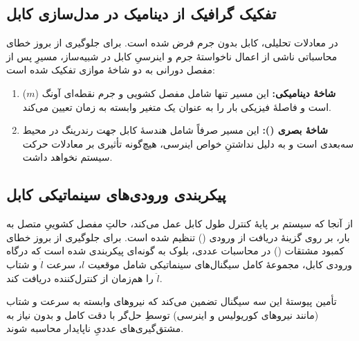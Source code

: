 \subsection{تفکیک گرافیک از دینامیک در مدل‌سازی کابل}

در معادلات تحلیلی، کابل بدون جرم فرض شده است. برای جلوگیری از بروز خطای محاسباتی ناشی از اعمال ناخواستهٔ جرم و اینرسیِ کابل در شبیه‌ساز، مسیرِ پس از مفصل دورانی به دو شاخهٔ موازی تفکیک شده است:
\begin{enumerate}
    \item \textbf{شاخهٔ دینامیکی:} این مسیر تنها شامل مفصل کشویی و جرم نقطه‌ای آونگ ($m$) است و فاصلهٔ فیزیکی بار را به عنوان یک متغیر وابسته به زمان تعیین می‌کند.
    \item \textbf{شاخهٔ بصری ():} این مسیر صرفاً شامل هندسهٔ کابل جهت رندرینگ در محیط سه‌بعدی است و به دلیل نداشتنِ خواص اینرسی، هیچ‌گونه تأثیری بر معادلات حرکت سیستم نخواهد داشت.
\end{enumerate}

\subsection{پیکربندی ورودی‌های سینماتیکی کابل}

از آنجا که سیستم بر پایهٔ کنترل طول کابل عمل می‌کند، حالتِ مفصل کشوییِ متصل به بار، بر روی گزینهٔ دریافت از ورودی () تنظیم شده است. برای جلوگیری از بروز خطای کمبود مشتقات () در محاسبات عددی، بلوک  به گونه‌ای پیکربندی شده است که درگاه ورودی کابل، مجموعهٔ کامل سیگنال‌های سینماتیکی شامل موقعیت $l$، سرعت $\dot{l}$ و شتاب $\ddot{l}$ را هم‌زمان از کنترل‌کننده دریافت کند.

تأمین پیوستهٔ این سه سیگنال تضمین می‌کند که نیروهای وابسته به سرعت و شتاب (مانند نیروهای کوریولیس و اینرسی) توسطِ حل‌گر  با دقت کامل و بدون نیاز به مشتق‌گیری‌های عددیِ ناپایدار محاسبه شوند.